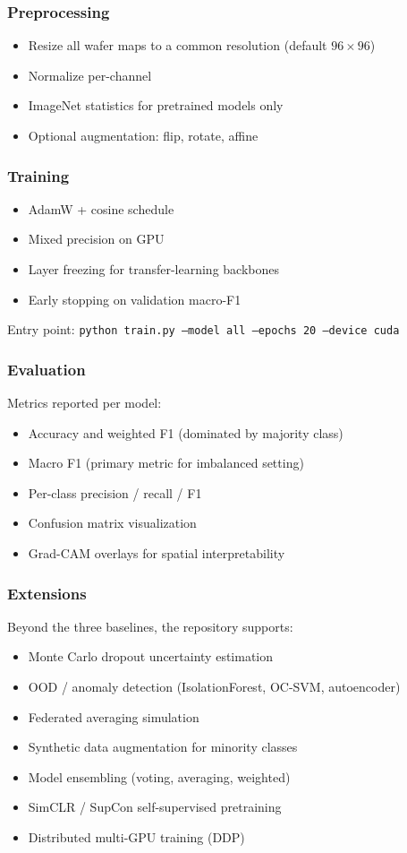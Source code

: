 \documentclass{beamer}
\begin{document}
\begin{frame}
  \frametitle{Preprocessing}
  \begin{itemize}
    \item Resize all wafer maps to a common resolution (default $96\times96$)
    \item Normalize per-channel
    \item ImageNet statistics for pretrained models only
    \item Optional augmentation: flip, rotate, affine
  \end{itemize}
\end{frame}

\begin{frame}
  \frametitle{Training}
  \begin{itemize}
    \item AdamW + cosine schedule
    \item Mixed precision on GPU
    \item Layer freezing for transfer-learning backbones
    \item Early stopping on validation macro-F1
  \end{itemize}

  \vspace{0.2cm}
  Entry point: \texttt{python train.py --model all --epochs 20 --device cuda}
\end{frame}

\begin{frame}
  \frametitle{Evaluation}
  Metrics reported per model:
  \begin{itemize}
    \item Accuracy and weighted F1 (dominated by majority class)
    \item Macro F1 (primary metric for imbalanced setting)
    \item Per-class precision / recall / F1
    \item Confusion matrix visualization
    \item Grad-CAM overlays for spatial interpretability
  \end{itemize}
\end{frame}

\begin{frame}
  \frametitle{Extensions}
  Beyond the three baselines, the repository supports:
  \begin{itemize}
    \item Monte Carlo dropout uncertainty estimation
    \item OOD / anomaly detection (IsolationForest, OC-SVM, autoencoder)
    \item Federated averaging simulation
    \item Synthetic data augmentation for minority classes
    \item Model ensembling (voting, averaging, weighted)
    \item SimCLR / SupCon self-supervised pretraining
    \item Distributed multi-GPU training (DDP)
  \end{itemize}
\end{frame}
\end{document}
